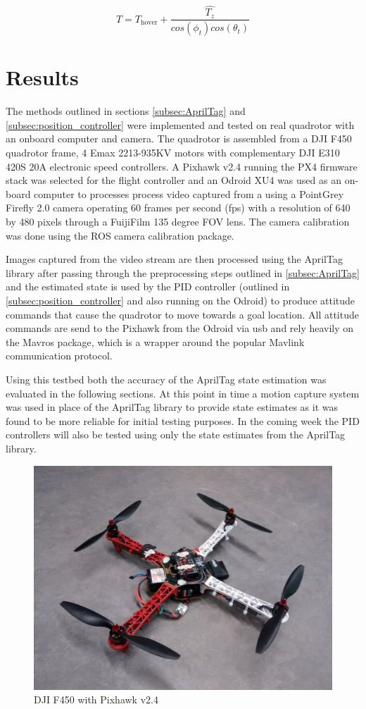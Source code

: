 \documentclass[11pt, twocolumn]{article}
\begin{document}
\begin{equation}
	\label{eq:pid_thrust_adjusted}
	T = 
		T_{\text{hover}} +
		\frac{\hat{T_{z}}}{cos(\phi_t) cos(\theta_t)}
\end{equation}

\section{Results}
The methods outlined in sections \ref{subsec:AprilTag} and \ref{subsec:position_controller} were implemented and tested on real quadrotor with an onboard computer and camera. The quadrotor is assembled from a DJI F450 quadrotor frame, 4 Emax 2213-935KV motors with complementary DJI E310 420S 20A electronic speed controllers. A Pixhawk v2.4 running the PX4 firmware stack was selected for the flight controller and an Odroid XU4 was used as an on-board computer to processes process video captured from a using a PointGrey Firefly 2.0 camera operating 60 frames per second (fps) with a resolution of 640 by 480 pixels through a FuijiFilm 135 degree FOV lens. The camera calibration was done using the ROS camera calibration package. 

Images captured from the video stream are then processed using the AprilTag library after passing through the preprocessing steps outlined in \ref{subsec:AprilTag} and the estimated state is used by the PID controller (outlined in \ref{subsec:position_controller} and also running on the Odroid) to produce attitude commands that cause the quadrotor to move towards a goal location. All attitude commands are send to the Pixhawk from the Odroid via usb and rely heavily on the Mavros package, which is a wrapper around the popular Mavlink communication protocol. 

Using this testbed both the accuracy of the AprilTag state estimation was evaluated in the following sections. At this point in time a motion capture system was used in place of the AprilTag library to provide state estimates as it was found to be more reliable for initial testing purposes. In the coming week the PID controllers will also be tested using only the state estimates from the AprilTag library. 


\begin{figure}[H]
	\centering
	\includegraphics[width=0.8\linewidth]{images/quadrotor.jpg}
	\caption{DJI F450 with Pixhawk v2.4}
	\label{Quadrotor}
\end{figure}
\end{document}
